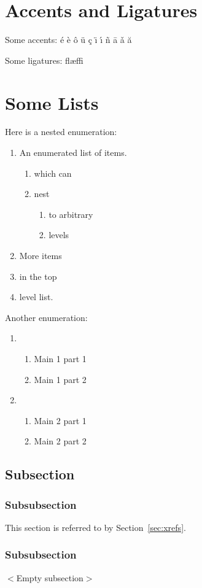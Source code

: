 \section{Accents and Ligatures}

Some accents:
\'{e}
\`{e}
\^{o}
\"{u}
\c{c}
\"{\i}
\'{\i}
\~{n}
\={a}
\v{a}
\u{a}

\noindent Some ligatures:
fl{\ae}ffi


\section{Some Lists}

Here is a nested enumeration:
\begin{enumerate}
	\item An enumerated list of items.
	\begin{enumerate}
		\item which can 
		\item nest
		\begin{enumerate}
			\item to arbitrary
			\item levels
		\end{enumerate}
	\end{enumerate}
	\item More items
	\item in the top
	\item level list.
\end{enumerate}
Another enumeration:
\begin{enumerate}
	\item
	\begin{enumerate}
		\item Main 1 part 1
		\item Main 1 part 2
	\end{enumerate}
	\item
	\begin{enumerate}
		\item Main 2 part 1
		\item Main 2 part 2
	\end{enumerate}
\end{enumerate}

\subsection{Subsection}

\subsubsection{Subsubsection}
\label{sec:nested}
This section is referred to by Section~\ref{sec:xrefs}.

\subsubsection{Subsubsection}
\textsf{$<$Empty subsection$>$}
